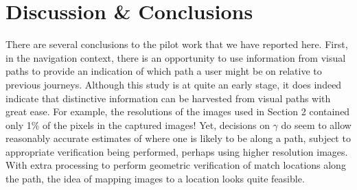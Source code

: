


\section{Discussion \& Conclusions}

There are several conclusions to the pilot work that we have reported here.  First, in the navigation context, there is an opportunity to use information from visual paths to provide an indication of which path a user might be on relative to previous journeys.  Although this study  is at quite an early stage, it does indeed indicate that distinctive information can be harvested from visual paths with great ease.  For example, the resolutions of the images used in Section 2 contained only 1\% of the pixels in the captured images!  Yet, decisions on $\gamma$ do seem to allow reasonably accurate estimates of where one is likely to be along a path, subject to appropriate verification being performed, perhaps using higher resolution images. With extra processing to perform geometric verification of match locations along the path, the idea of mapping images to a location looks quite feasible.


